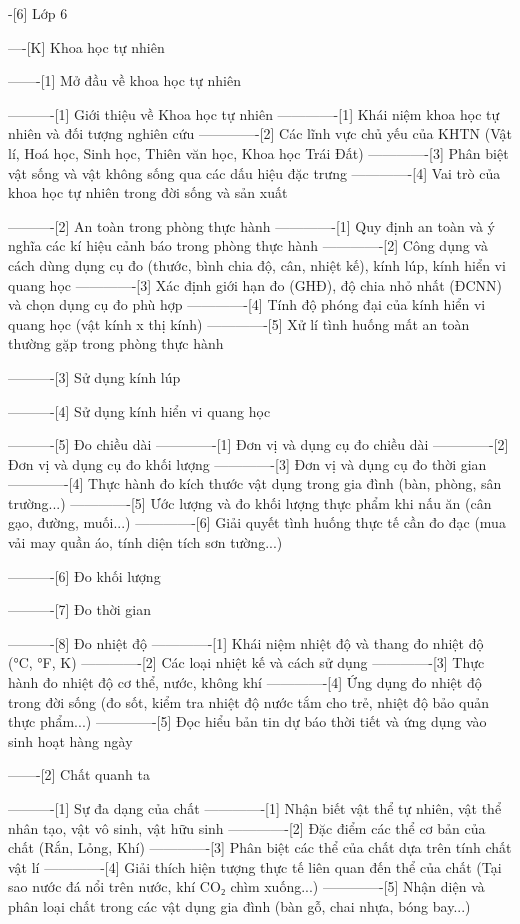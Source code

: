 -[6] Lớp 6

----[K] Khoa học tự nhiên

-------[1] Mở đầu về khoa học tự nhiên

----------[1] Giới thiệu về Khoa học tự nhiên
-------------[1] Khái niệm khoa học tự nhiên và đối tượng nghiên cứu
-------------[2] Các lĩnh vực chủ yếu của KHTN (Vật lí, Hoá học, Sinh học, Thiên văn học, Khoa học Trái Đất)
-------------[3] Phân biệt vật sống và vật không sống qua các dấu hiệu đặc trưng
-------------[4] Vai trò của khoa học tự nhiên trong đời sống và sản xuất

----------[2] An toàn trong phòng thực hành
-------------[1] Quy định an toàn và ý nghĩa các kí hiệu cảnh báo trong phòng thực hành
-------------[2] Công dụng và cách dùng dụng cụ đo (thước, bình chia độ, cân, nhiệt kế), kính lúp, kính hiển vi quang học
-------------[3] Xác định giới hạn đo (GHĐ), độ chia nhỏ nhất (ĐCNN) và chọn dụng cụ đo phù hợp
-------------[4] Tính độ phóng đại của kính hiển vi quang học (vật kính x thị kính)
-------------[5] Xử lí tình huống mất an toàn thường gặp trong phòng thực hành

----------[3] Sử dụng kính lúp

----------[4] Sử dụng kính hiển vi quang học

----------[5] Đo chiều dài
-------------[1] Đơn vị và dụng cụ đo chiều dài
-------------[2] Đơn vị và dụng cụ đo khối lượng
-------------[3] Đơn vị và dụng cụ đo thời gian
-------------[4] Thực hành đo kích thước vật dụng trong gia đình (bàn, phòng, sân trường...)
-------------[5] Ước lượng và đo khối lượng thực phẩm khi nấu ăn (cân gạo, đường, muối...)
-------------[6] Giải quyết tình huống thực tế cần đo đạc (mua vải may quần áo, tính diện tích sơn tường...)

----------[6] Đo khối lượng

----------[7] Đo thời gian

----------[8] Đo nhiệt độ
-------------[1] Khái niệm nhiệt độ và thang đo nhiệt độ (°C, °F, K)
-------------[2] Các loại nhiệt kế và cách sử dụng
-------------[3] Thực hành đo nhiệt độ cơ thể, nước, không khí
-------------[4] Ứng dụng đo nhiệt độ trong đời sống (đo sốt, kiểm tra nhiệt độ nước tắm cho trẻ, nhiệt độ bảo quản thực phẩm...)
-------------[5] Đọc hiểu bản tin dự báo thời tiết và ứng dụng vào sinh hoạt hàng ngày

-------[2] Chất quanh ta

----------[1] Sự đa dạng của chất
-------------[1] Nhận biết vật thể tự nhiên, vật thể nhân tạo, vật vô sinh, vật hữu sinh
-------------[2] Đặc điểm các thể cơ bản của chất (Rắn, Lỏng, Khí)
-------------[3] Phân biệt các thể của chất dựa trên tính chất vật lí
-------------[4] Giải thích hiện tượng thực tế liên quan đến thể của chất (Tại sao nước đá nổi trên nước, khí CO₂ chìm xuống...)
-------------[5] Nhận diện và phân loại chất trong các vật dụng gia đình (bàn gỗ, chai nhựa, bóng bay...)

